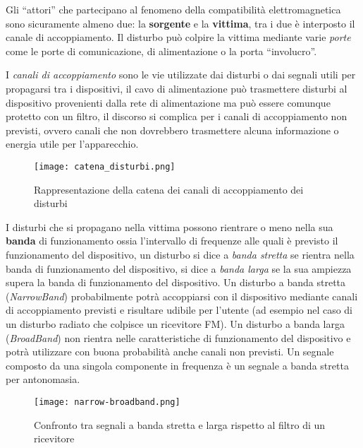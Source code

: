 Gli ``attori'' che partecipano al fenomeno della compatibilità elettromagnetica sono sicuramente
almeno due: la \textbf{sorgente} e la \textbf{vittima}, tra i due è interposto il canale di accoppiamento.
Il disturbo può colpire la vittima mediante varie \textit{porte} come le porte di comunicazione,
di alimentazione o la porta ``involucro''.

I \textit{canali di accoppiamento} sono le vie utilizzate dai disturbi o dai segnali utili per propagarsi tra i 
dispositivi, il cavo di alimentazione può trasmettere disturbi al dispositivo provenienti dalla rete di alimentazione
ma può essere comunque protetto con un filtro, il discorso si complica per i canali di accoppiamento non previsti,
ovvero canali che non dovrebbero trasmettere alcuna informazione o energia utile per l'apparecchio.

\begin{figure}[h]
 \texttt{[image: catena\_disturbi.png]}
 \centering
 \caption{Rappresentazione della catena dei canali di accoppiamento dei disturbi}
 \label{fig:catena_disturbi}
\end{figure}

I disturbi che si propagano nella vittima possono rientrare o meno nella sua \textbf{banda} di funzionamento
ossia l'intervallo di frequenze alle quali è previsto il funzionamento del dispositivo, un disturbo si dice
a \textit{banda stretta} se rientra nella banda di funzionamento del dispositivo, si dice a \textit{banda larga}
se la sua ampiezza supera la banda di funzionamento del dispositivo.
Un disturbo a banda stretta (\textit{NarrowBand}) probabilmente potrà accoppiarsi con il dispositivo mediante
canali di accoppiamento previsti e risultare udibile per l'utente (ad esempio nel caso di un disturbo radiato che colpisce
un ricevitore FM).
Un disturbo a banda larga (\textit{BroadBand}) non rientra nelle caratteristiche di funzionamento del dispositivo
e potrà utilizzare con buona probabilità anche canali non previsti.
Un segnale composto da una singola componente in frequenza è un segnale a banda stretta per antonomasia.
\begin{figure}[h]
 \texttt{[image: narrow-broadband.png]}
 \centering
 \caption{Confronto tra segnali a banda stretta e larga rispetto al filtro di un ricevitore}
 \label{fig:narrow-broadband}
\end{figure}






